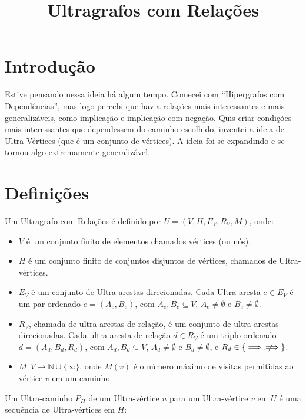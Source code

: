 \documentclass{article}
\title{Ultragrafos com Relações}
\author{} %
\begin{document}
\maketitle

\section{Introdução}

Estive pensando nessa ideia há algum tempo. Comecei com ``Hipergrafos com Dependências'', mas logo percebi que havia relações mais interessantes e mais generalizáveis, como implicação e implicação com negação. Quis criar condições mais interessantes que dependessem do caminho escolhido, inventei a ideia de Ultra-Vértices (que é um conjunto de vértices). A ideia foi se expandindo e se tornou algo extremamente generalizável.

\section{Definições}

Um Ultragrafo com Relações é definido por \( U = (V, H, E_V, R_V, M) \), onde:

\begin{itemize}
    \item \( V \) é um conjunto finito de elementos chamados vértices (ou nós).
    \item \( H \) é um conjunto finito de conjuntos disjuntos de vértices, chamados de Ultra-vértices.
    \item \( E_V \) é um conjunto de Ultra-arestas direcionadas. Cada Ultra-aresta \( e \in E_V \) é um par ordenado \( e = (A_e, B_e) \), com \( A_e, B_e \subseteq V \), \( A_e \neq \emptyset \) e \( B_e \neq \emptyset \).
    \item \( R_V \), chamada de ultra-arestas de relação, é um conjunto de ultra-arestas direcionadas. Cada ultra-aresta de relação \( d \in R_V \) é um triplo ordenado \( d = (A_d, B_d, R_d) \), com \( A_d, B_d \subseteq V \), \( A_d \neq \emptyset \) e \( B_d \neq \emptyset \), e \( R_d \in \{\implies, \not\!\!\!\implies\} \).
    \item \( M: V \to \mathbb{N} \cup \{\infty\} \), onde \( M(v) \) é o número máximo de visitas permitidas ao vértice \( v \) em um caminho.
\end{itemize}

Um Ultra-caminho \( P_H \) de um Ultra-vértice \( u \) para um Ultra-vértice \( v \) em \( U \) é uma sequência de Ultra-vértices em \( H \):
\end{document}
